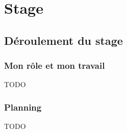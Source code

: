 \chapter{Stage}

\section{Déroulement du stage} %

\subsection{Mon rôle et mon travail}

TODO

\subsection{Planning}

TODO





